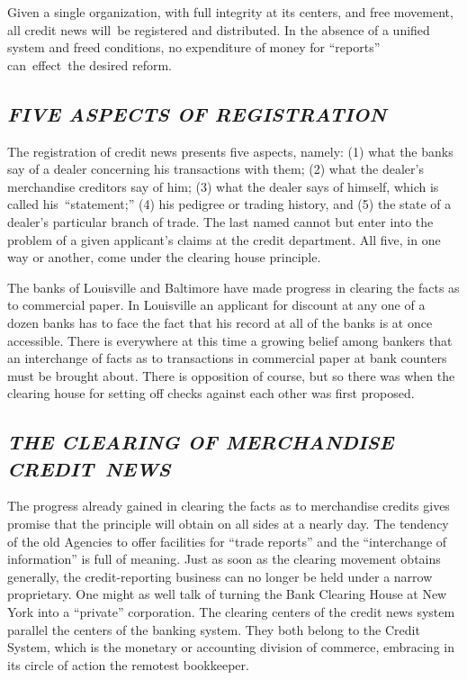 \documentclass[openany,nobib]{tufte-book}
\begin{document}
Given a single organization, with full integrity at its centers, and
free movement, all credit news will~be registered and distributed. In
the absence of a unified system and freed conditions, no expenditure of
money for ``reports'' can~effect~the desired reform.~

\hypertarget{five-aspects-of-registration}{%
\subsection{\texorpdfstring{\emph{FIVE ASPECTS OF
REGISTRATION}}{FIVE ASPECTS OF REGISTRATION}}\label{five-aspects-of-registration}}

The registration of credit news presents five aspects, namely: (1) what
the banks say of a dealer concerning his transactions with them; (2)
what the dealer's merchandise creditors say of him; (3) what the dealer
says of himself, which is called his~``statement;'' (4) his pedigree or
trading history, and (5) the state of a dealer's particular branch of
trade. The last named cannot but enter into the problem of a given
applicant's claims at the credit department. All five, in one way or
another, come under the clearing house principle.~

The banks of Louisville and Baltimore have made progress in clearing the
facts as to commercial paper. In Louisville an applicant for discount at
any one of a dozen banks has to face the fact that his record at all of
the banks is at once accessible. There is everywhere at this time a
growing belief among bankers that an interchange of facts as to
transactions in commercial paper at bank counters must be brought about.
There is opposition of course, but so there was when the clearing house
for setting off checks against each other was first proposed.~

\hypertarget{the-clearing-of-merchandise-credit-news}{%
\subsection{\texorpdfstring{\emph{THE CLEARING OF MERCHANDISE
CREDIT~NEWS}}{THE CLEARING OF MERCHANDISE CREDIT~NEWS}}\label{the-clearing-of-merchandise-credit-news}}

The progress already gained in clearing the facts as to merchandise
credits gives promise that the principle will obtain on all sides at a
nearly day. The tendency of the old Agencies to offer facilities for
``trade reports'' and the ``interchange of information'' is full of
meaning. Just as soon as the clearing movement obtains generally, the
credit-reporting business can no longer be held under a narrow
proprietary. One might as well talk of turning the Bank Clearing House
at New York into a ``private'' corporation. The clearing centers of the
credit news system parallel the centers of the banking system. They both
belong to the Credit System, which is the monetary or accounting
division of commerce, embracing in its circle of action the remotest
bookkeeper.~
\end{document}
